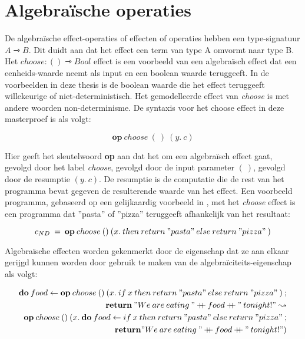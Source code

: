 \section{Algebraïsche operaties}
De algebraïsche effect-operaties of effecten of operaties hebben een type-signatuur $A \rightarrowtriangle B$. Dit duidt aan dat het effect een term van type A omvormt naar type B. Het $choose:() \rightarrowtriangle Bool$ effect is een voorbeeld van een algebraïsch effect dat een eenheids-waarde neemt als input en een boolean waarde teruggeeft. In de voorbeelden in deze thesis is de boolean waarde die het effect teruggeeft willekeurige of niet-deterministisch. Het gemodelleerde effect van \emph{choose} is met andere woorden non-determinisme. De syntaxis voor het choose effect in deze masterproef is als volgt:

\begin{equation}
    \textbf{op} \: choose \: (\:) \: (y. \: c)
\end{equation}

Hier geeft het sleutelwoord \textbf{op} aan dat het om een algebraïsch effect gaat, gevolgd door het label \textit{choose}, gevolgd door de input parameter $(\:)$, gevolgd door de resumptie $(y. \: c)$. De resumptie is de computatie die de rest van het programma bevat gegeven de resulterende waarde van het effect. Een voorbeeld programma, gebaseerd op een gelijkaardig voorbeeld in \cite{Bosman2022}, met het \textit{choose} effect is een programma dat ''pasta'' of ''pizza'' teruggeeft afhankelijk van het resultaat:

\begin{equation}
    c_{ND}\:=\:\textbf{op}\:choose\:()\:(x.\:then\:return\:"pasta"\:else\:return\:"pizza"\:)
\end{equation}

Algebraïsche effecten worden gekenmerkt door de eigenschap dat ze aan elkaar gerijgd kunnen worden door gebruik te maken van de algebraïciteits-eigenschap als volgt:

\begin{equation} \label{eq:algFood}
    \begin{split}
        \textbf{do}\:food \leftarrow \textbf{op}\:choose\:()\:(x. \: if \: x \:then\:return\:"pasta"\:else\:return\:"pizza"\:) \: ; \\ \: \textbf{return}\: "We \: are \: eating \: " \mathbin{{+}\mspace{-8mu}{+}}  food \mathbin{{+}\mspace{-8mu}{+}} " \: tonight!"  \leadsto \\
        \textbf{op}\:choose\:()\:(x.\: \textbf{do}\:food \leftarrow  if \: x \:then\:return\:"pasta"\:else\:return\:"pizza"\:; \\ \: \textbf{return} "We \: are \: eating \: " \mathbin{{+}\mspace{-8mu}{+}}  food \mathbin{{+}\mspace{-8mu}{+}} " \: tonight!" )
    \end{split}
\end{equation}

